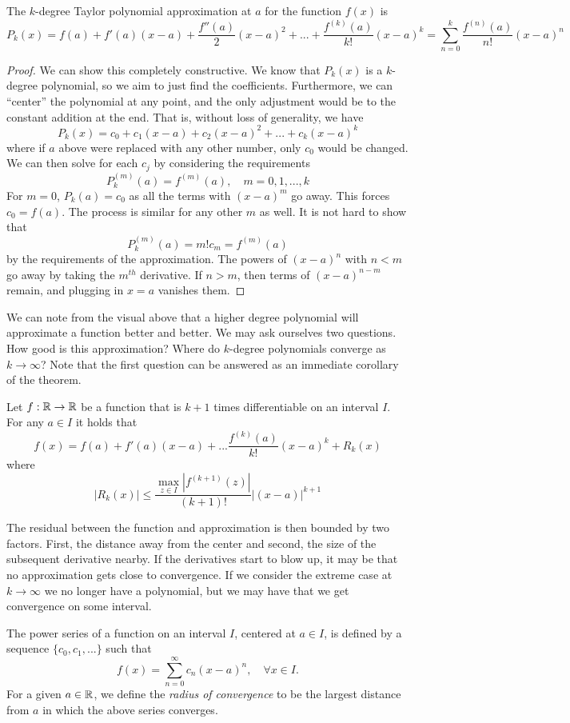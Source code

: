 \documentclass[11pt]{article}
\begin{document}
\begin{theorem}{}{}
    The $k$-degree Taylor polynomial approximation at $a$ for the function $f(x)$ is $$P_k(x) = f(a) + f'(a)(x-a) + \frac{f''(a)}{2}(x-a)^2 +  ... + \frac{f^{(k)}(a)}{k!}(x-a)^k = \sum_{n=0}^k \frac{f^{(n)}(a)}{n!}(x-a)^n$$
\end{theorem}
\begin{proof}
    We can show this completely constructive. We know that $P_k(x)$ is a $k$-degree polynomial, so we aim to just find the coefficients. Furthermore, we can ``center'' the polynomial at any point, and the only adjustment would be to the constant addition at the end. That is, without loss of generality, we have $$P_k(x) = c_0 + c_1(x-a) + c_2(x-a)^2 + ... + c_k(x-a)^k$$
    where if $a$ above were replaced with any other number, only $c_0$ would be changed. We can then solve for each $c_j$ by considering the requirements $$P_k^{(m)}(a) = f^{(m)}(a), \quad m = 0, 1, ..., k$$
    For $m  = 0$, $P_k(a) = c_0$ as all the terms with $(x-a)^m$ go away. This forces $c_0 = f(a).$ The process is similar for any other $m$ as well. It is not hard to show that $$P_k^{(m)}(a) = m!c_m = f^{(m)}(a)$$ by the requirements of the approximation. The powers of $(x-a)^n$ with $n < m$ go away by taking the $m^{th}$ derivative. If $n > m$, then terms of $(x-a)^{n-m}$ remain, and plugging in $x=a$ vanishes them. 
\end{proof}

We can note from the visual above that a higher degree polynomial will approximate a function better and better. We may ask ourselves two questions. How good is this approximation? Where do $k$-degree polynomials converge as $k \to \infty$? Note that the first question can be answered as an immediate corollary of the theorem. 
\begin{corollary}{}{}
    Let $f : \mathbb{R} \to \mathbb{R}$ be a function that is $k+1$ times differentiable on an interval $I$. For any $a \in I$ it holds that $$f(x) = f(a) + f'(a)(x-a) + ... \frac{f^{(k)}(a)}{k!}(x-a)^k + R_k(x) $$
    where $$|R_k(x)| \leq \frac{\displaystyle\max_{z \in I}|f^{(k+1)}(z)|}{(k+1)!}|(x-a)|^{k+1} $$ 
\end{corollary}

The residual between the function and approximation is then bounded by two factors. First, the distance away from the center and second, the size of the subsequent derivative nearby. If the derivatives start to blow up, it may be that no approximation gets close to convergence. If we consider the extreme case at $k \to \infty$ we no longer have a polynomial, but we may have that we get convergence on some interval. 
\begin{definition}{}{}
    The power series of a function on an interval $I$, centered at $a \in I$, is defined by a sequence $\{c_0, c_1, ...\}$ such that $$f(x) = \sum_{n=0}^\infty c_n(x-a)^n, \quad \forall x \in I.$$
    For a given $a \in \mathbb{R}$, we define the \textit{radius of convergence} to be the largest distance from $a$ in which the above series converges.
\end{definition}
\end{document}
